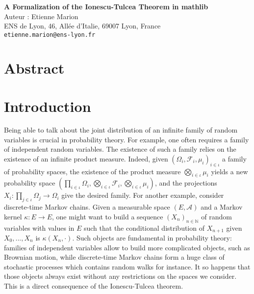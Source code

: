 \documentclass{article}
\newcommand{\A}{\mathcal{A}}
\newcommand{\F}{\mathcal{F}}
\newcommand{\N}{\mathbb{N}}
\theoremstyle{definition}
\theoremstyle{remark}
\begin{document}
	\begin{center}
		{\Large\bf A Formalization of the Ionescu-Tulcea Theorem in mathlib} \\
		\vspace{1cm}
		Auteur : Etienne Marion \\
		\vspace{1cm}
		ENS de Lyon, 46, Allée d’Italie, 69007 Lyon, France \\
		\texttt{etienne.marion@ens-lyon.fr}
	\end{center}

	\vspace{0.5cm}

	\section*{Abstract}

	\section{Introduction}
	Being able to talk about the joint distribution of an infinite family of random variables is crucial in probability theory. For example, one often requires a family of independent random variables. The existence of such a family relies on the existence of an infinite product measure. Indeed, given $(\Omega_i, \F_i, \mu_i)_{i\in\iota}$ a family of probability spaces, the existence of the product measure $\bigotimes_{i\in\iota}\mu_i$ yields a new probability space $(\prod_{i\in\iota}\Omega_i, \bigotimes_{i\in\iota}\F_i, \bigotimes_{i\in\iota}\mu_i)$, and the projections $X_i : \prod_{j\in\iota}\Omega_j \to \Omega_i$ give the desired family. For another example, consider discrete-time Markov chains. Given a measurable space $(E, \A)$ and a Markov kernel $\kappa : E \to E$, one might want to build a sequence $(X_n)_{n\in\N}$ of random variables with values in $E$ such that the conditional distribution of $X_{n+1}$ given $X_0, ..., X_n$ is $\kappa(X_n,\cdot)$. Such objects are fundamental in probability theory: families of independent variables allow to build more complicated objects, such as Brownian motion, while discrete-time Markov chains form a huge class of stochastic processes which contains random walks for instance. It so happens that those objects always exist without any restrictions on the spaces we consider. This is a direct consequence of the Ionescu-Tulcea theorem.
\end{document}
